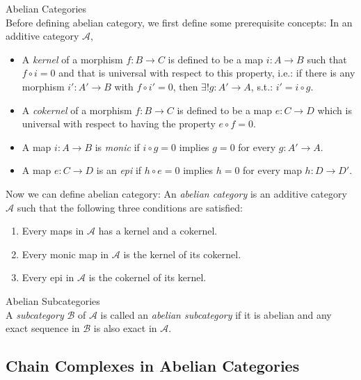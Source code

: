 \begin{definition}{Abelian Categories}\\
Before defining abelian category, we first define some prerequisite concepts: In an additive category $\mathcal{A}$, 
\begin{itemize}
    \item A \textit{kernel} of a morphism $f:B\to C$ is defined to be a map $i:A\to B$ such that $f\circ i=0$ and that is universal with respect to this property, i.e.: if there is any morphism $i': A'\to B$ with $f\circ i'=0$, then $\exists! g:A'\to A$, s.t.: $i'= i\circ g$.

    \item A \textit{cokernel} of a morphism $f:B\to C$ is defined to be a map $e:C\to D$ which is universal with respect to having the property $e\circ f=0$.

    \item A map $i:A \to B$ is \textit{monic} if $i \circ g=0$ implies $g=0$ for every $g:A'\to A$.

    \item A map $e:C \to D$ is an \textit{epi} if $h\circ e=0$ implies $h=0$ for every map $h:D\to D'$.
\end{itemize}
Now we can define abelian category: An \textit{abelian category} is an additive category $\mathcal{A}$ such that the following three conditions are satisfied:
\begin{enumerate}
    \item Every maps in $\mathcal{A}$ has a kernel and a cokernel.
    \item Every monic map in $\mathcal{A}$ is the kernel of its cokernel.
    \item Every epi in $\mathcal{A}$ is the cokernel of its kernel.
\end{enumerate}
\end{definition}


\begin{definition}{Abelian Subcategories}\\
A \textit{subcategory} $\mathcal{B}$ of $\mathcal{A}$ is called an \textit{abelian subcategory} if it is abelian and any exact sequence in $\mathcal{B}$ is also exact in $\mathcal{A}$.
\end{definition}

\subsection{Chain Complexes in Abelian Categories}


